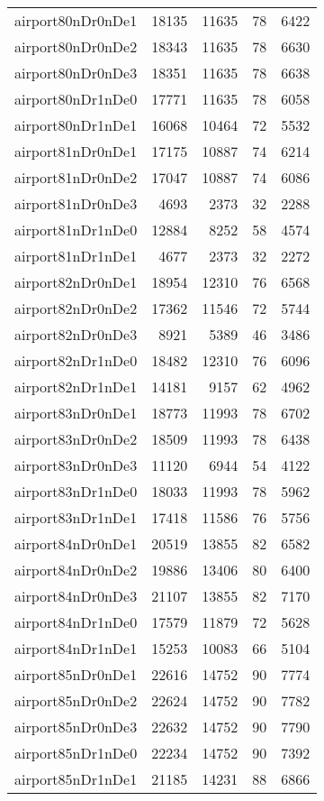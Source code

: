 \begin{longtable}{lrrrr}
airport80nDr0nDe1 & 18135 & 11635 & 78 & 6422 \\
airport80nDr0nDe2 & 18343 & 11635 & 78 & 6630 \\
airport80nDr0nDe3 & 18351 & 11635 & 78 & 6638 \\
airport80nDr1nDe0 & 17771 & 11635 & 78 & 6058 \\
airport80nDr1nDe1 & 16068 & 10464 & 72 & 5532 \\
airport81nDr0nDe1 & 17175 & 10887 & 74 & 6214 \\
airport81nDr0nDe2 & 17047 & 10887 & 74 & 6086 \\
airport81nDr0nDe3 & 4693 & 2373 & 32 & 2288 \\
airport81nDr1nDe0 & 12884 & 8252 & 58 & 4574 \\
airport81nDr1nDe1 & 4677 & 2373 & 32 & 2272 \\
airport82nDr0nDe1 & 18954 & 12310 & 76 & 6568 \\
airport82nDr0nDe2 & 17362 & 11546 & 72 & 5744 \\
airport82nDr0nDe3 & 8921 & 5389 & 46 & 3486 \\
airport82nDr1nDe0 & 18482 & 12310 & 76 & 6096 \\
airport82nDr1nDe1 & 14181 & 9157 & 62 & 4962 \\
airport83nDr0nDe1 & 18773 & 11993 & 78 & 6702 \\
airport83nDr0nDe2 & 18509 & 11993 & 78 & 6438 \\
airport83nDr0nDe3 & 11120 & 6944 & 54 & 4122 \\
airport83nDr1nDe0 & 18033 & 11993 & 78 & 5962 \\
airport83nDr1nDe1 & 17418 & 11586 & 76 & 5756 \\
airport84nDr0nDe1 & 20519 & 13855 & 82 & 6582 \\
airport84nDr0nDe2 & 19886 & 13406 & 80 & 6400 \\
airport84nDr0nDe3 & 21107 & 13855 & 82 & 7170 \\
airport84nDr1nDe0 & 17579 & 11879 & 72 & 5628 \\
airport84nDr1nDe1 & 15253 & 10083 & 66 & 5104 \\
airport85nDr0nDe1 & 22616 & 14752 & 90 & 7774 \\
airport85nDr0nDe2 & 22624 & 14752 & 90 & 7782 \\
airport85nDr0nDe3 & 22632 & 14752 & 90 & 7790 \\
airport85nDr1nDe0 & 22234 & 14752 & 90 & 7392 \\
airport85nDr1nDe1 & 21185 & 14231 & 88 & 6866 \\

\end{longtable}
